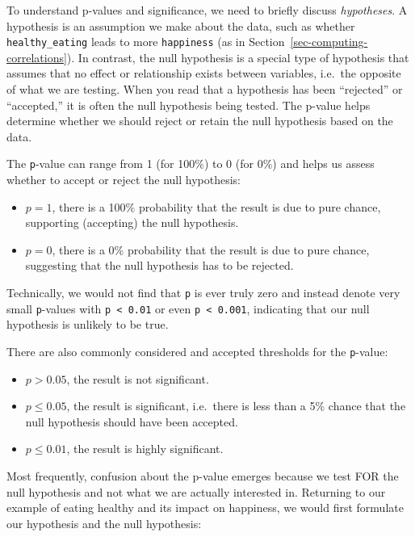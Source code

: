 \documentclass[
  letterpaper,
  DIV=11,
  numbers=noendperiod]{scrreprt}
\begin{document}
To understand p-values and significance, we need to briefly discuss
\emph{hypotheses}. A hypothesis is an assumption we make about the data,
such as whether \texttt{healthy\_eating} leads to more
\texttt{happiness} (as in Section~\ref{sec-computing-correlations}). In
contrast, the null hypothesis is a special type of hypothesis that
assumes that no effect or relationship exists between variables,
i.e.~the opposite of what we are testing. When you read that a
hypothesis has been ``rejected'' or ``accepted,'' it is often the null
hypothesis being tested. The p-value helps determine whether we should
reject or retain the null hypothesis based on the data.

The \texttt{p}-value can range from 1 (for 100\%) to 0 (for 0\%) and
helps us assess whether to accept or reject the null hypothesis:

\begin{itemize}
\item
  \(p = 1\), there is a 100\% probability that the result is due to pure
  chance, supporting (accepting) the null hypothesis.
\item
  \(p = 0\), there is a 0\% probability that the result is due to pure
  chance, suggesting that the null hypothesis has to be rejected.
\end{itemize}

Technically, we would not find that \texttt{p} is ever truly zero and
instead denote very small \texttt{p}-values with
\texttt{p\ \textless{}\ 0.01} or even \texttt{p\ \textless{}\ 0.001},
indicating that our null hypothesis is unlikely to be true.

There are also commonly considered and accepted thresholds for the
\texttt{p}-value:

\begin{itemize}
\item
  \(p > 0.05\), the result is not significant.
\item
  \(p \leq 0.05\), the result is significant, i.e.~there is less than a
  5\% chance that the null hypothesis should have been accepted.
\item
  \(p \leq 0.01\), the result is highly significant.
\end{itemize}

Most frequently, confusion about the p-value emerges because we test FOR
the null hypothesis and not what we are actually interested in.
Returning to our example of eating healthy and its impact on happiness,
we would first formulate our hypothesis and the null hypothesis:
\end{document}

